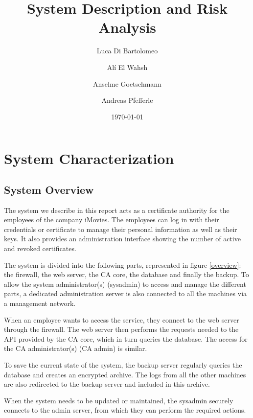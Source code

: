 \documentclass[english]{article}
\title{\huge\sffamily\bfseries System Description and Risk Analysis}
\author{Luca Di Bartolomeo \and Al\'{i}  El Wahsh \and Anselme Goetschmann \and Andreas Pfefferle}
\date{\today}
\begin{document}
\maketitle


\setcounter{tocdepth}{2}
\tableofcontents
\pagebreak


\section{System Characterization}

\subsection{System Overview}

The system we describe in this report acts as a certificate authority for the employees of the company iMovies. The employees can log in with their credentials or certificate to manage their personal information as well as their keys. It also provides an administration interface showing the number of active and revoked certificates.

The system is divided into the following parts, represented in figure \ref{overview}: the firewall, the web server, the CA core, the database and finally the backup. To allow the system administrator(s) (sysadmin) to access and manage the different parts, a dedicated administration server is also connected to all the machines via a management network.

When an employee wants to access the service, they connect to the web server through the firewall. The web server then performs the requests needed to the API provided by the CA core, which in turn queries the database. The access for the CA administrator(s) (CA admin) is similar.

To save the current state of the system, the backup server regularly queries the database and creates an encrypted archive. The logs from all the other machines are also redirected to the backup server and included in this archive.

When the system needs to be updated or maintained, the sysadmin securely connects to the admin server, from which they can perform the required actions.
\end{document}
